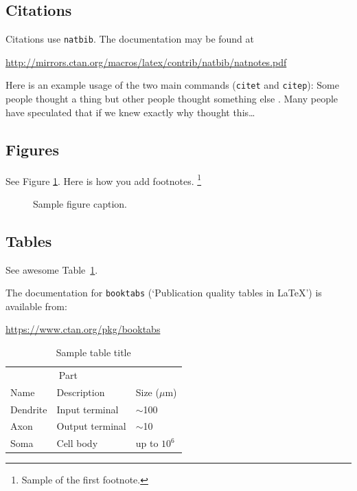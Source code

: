 \documentclass{article}
\begin{document}
\subsection{Citations}
Citations use \verb+natbib+. The documentation may be found at
\begin{center}
	\url{http://mirrors.ctan.org/macros/latex/contrib/natbib/natnotes.pdf}
\end{center}

Here is an example usage of the two main commands (\verb+citet+ and \verb+citep+): Some people thought a thing \citep{kour2014real, hadash2018estimate} but other people thought something else \citep{kour2014fast}. Many people have speculated that if we knew exactly why \citet{kour2014fast} thought this\dots

\subsection{Figures}
\lipsum[10]
See Figure \ref{fig:fig1}. Here is how you add footnotes. \footnote{Sample of the first footnote.}
\lipsum[11]

\begin{figure}
	\centering
	\fbox{\rule[-.5cm]{4cm}{4cm} \rule[-.5cm]{4cm}{0cm}}
	\caption{Sample figure caption.}
	\label{fig:fig1}
\end{figure}

\subsection{Tables}
See awesome Table~\ref{tab:table}.

The documentation for \verb+booktabs+ (`Publication quality tables in LaTeX') is available from:
\begin{center}
	\url{https://www.ctan.org/pkg/booktabs}
\end{center}


\begin{table}
	\caption{Sample table title}
	\centering
	\begin{tabular}{lll}
		\toprule
		\multicolumn{2}{c}{Part}                   \\
		\cmidrule(r){1-2}
		Name     & Description     & Size ($\mu$m) \\
		\midrule
		Dendrite & Input terminal  & $\sim$100     \\
		Axon     & Output terminal & $\sim$10      \\
		Soma     & Cell body       & up to $10^6$  \\
		\bottomrule
	\end{tabular}
	\label{tab:table}
\end{table}
\end{document}
